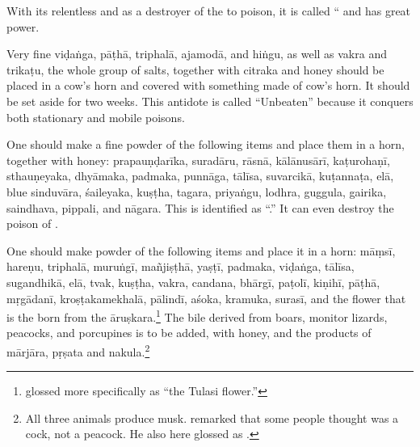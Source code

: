 \begin{translation}
With its relentless  and as a destroyer of the
 to poison, it is called “\label{mahāgada} and has great power.

\item[63cd--65ab]

Very fine \gls{viḍaṅga}, \gls{pāṭhā}, \gls{triphalā}, \gls{ajamodā},
and \gls{hiṅgu}, as well as \gls{vakra} and \gls{trikaṭu}, the whole
group of salts, together with \gls{citraka} and honey should be placed
in a cow's horn and covered with something made of cow's horn.  It
should be set aside for two weeks. %
This antidote is called “Unbeaten” because it conquers  both
stationary and mobile poisons.

\item [65cd--68ab]

One should make a fine powder of the following items and place them in a 
horn, together with honey: %
\gls{prapauṇḍarīka},
\gls{suradāru},
\gls{rāsnā},
\gls{kālānusārī},
\gls{kaṭurohaṇī},
\gls{sthauṇeyaka}, 
\gls{dhyāmaka},
\gls{padmaka}, 
\gls{punnāga},
\gls{tālīsa}, 
\gls{suvarcikā},
\gls{kuṭannaṭa}, 
\gls{elā},
blue \gls{sinduvāra}, 
\gls{śaileyaka},
\gls{kuṣṭha},
\gls{tagara},
\gls{priyaṅgu},
\gls{lodhra},
\gls{guggula}, 
\gls{gairika}, 
\gls{saindhava}, %
\gls{pippali}, 
and 
\gls{nāgara}.  This  is identified as 
“.” It can even destroy the poison of  .


\item [69cd--72ab] 

One should make powder of the following items and place it in a 
horn:
\gls{māṃsī},
\gls{hareṇu},
\gls{triphalā},
\gls{muruṅgī},
\gls{mañjiṣṭhā},
\gls{yaṣṭī},
\gls{padmaka},
\gls{viḍaṅga},
\gls{tālīsa},
\gls{sugandhikā},
\gls{elā},
\gls{tvak},
\gls{kuṣṭha},
\gls{vakra}, 
\gls{candana}, 
\gls{bhārgī}, 
\gls{paṭolī},
\gls{kiṇihī}, 
\gls{pāṭhā},
\gls{mṛgādanī},
\gls{kroṣṭakamekhalā}, 
\gls{pālindī}, 
\gls{aśoka}, 
\gls{kramuka}, 
\gls{surasī},
and the flower that is the  born from the 
\gls{āruṣkara}.\footnote{ glossed  more 
specifically as  “the Tulasi flower.”} 
The bile derived from boars, monitor lizards, peacocks, and 
porcupines is to be added, with honey, and the products 
of \gls{mārjāra}, \gls{pṛṣata} and \gls{nakula}.\footnote{All three animals 
produce musk.    remarked that some people thought 
 was a cock, not a peacock.  He also here glossed  as 
.}  


\end{translation}
